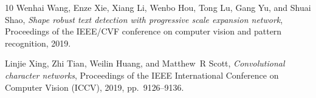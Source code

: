 \documentclass{zapiski}
\begin{document}
\begin{thebibliography}{10}
Wenhai Wang, Enze Xie, Xiang Li, Wenbo Hou, Tong Lu, Gang Yu, and Shuai Shao,
  \emph{Shape robust text detection with progressive scale expansion network},
Proceedings of the IEEE/CVF conference on computer vision and pattern recognition, 2019.


Linjie Xing, Zhi Tian, Weilin Huang, and Matthew~R Scott, \emph{Convolutional
  character networks}, Proceedings of the IEEE International Conference on
  Computer Vision (ICCV), 2019, pp.~9126--9136.





\end{thebibliography}
\end{document}

